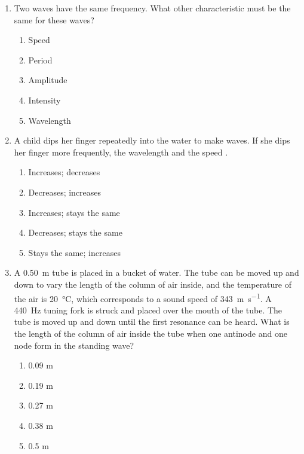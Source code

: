 \documentclass{../../../oss-classkick}
\begin{document}
\begin{multicols}{2}
\begin{enumerate}[leftmargin=18pt]
  \item Two waves have the same frequency. What other characteristic must be
    the same for these waves?
    \begin{enumerate}[nosep,leftmargin=18pt,label=(\Alph*)]
    \item Speed
    \item Period
    \item Amplitude
    \item Intensity
    \item Wavelength
    \end{enumerate}

  \item A child dips her finger repeatedly into the water to make waves. If she
    dips her finger more frequently, the wavelength \underline{\hspace{.3in}}
    and the speed \underline{\hspace{.3in}}.
    \begin{enumerate}[nosep,leftmargin=18pt,label=(\Alph*)]
    \item Increases; decreases
    \item Decreases; increases
    \item Increases; stays the same
    \item Decreases; stays the same
    \item Stays the same; increases
    \end{enumerate}
    \vspace{.7in}
    
  \item A \SI{.50}{\metre} tube is placed in a bucket of water. The tube can be
    moved up and down to vary the length of the column of air inside, and the
    temperature of the air is \SI{20}{\celsius}, which corresponds to a sound
    speed of \SI{343}{\metre\per\second}. A \SI{440}{\hertz} tuning fork is
    struck and placed over the mouth of the tube. The tube is moved up and down
    until the first resonance can be heard. What is the length of the column of
    air inside the tube when one antinode and one node form in the standing
    wave?
    \begin{enumerate}[nosep,leftmargin=18pt,label=(\Alph*)]
    \item 0.09 m
    \item 0.19 m
    \item 0.27 m
    \item 0.38 m
    \item 0.5 m
    \end{enumerate}


\end{enumerate}
\end{multicols}
\end{document}
